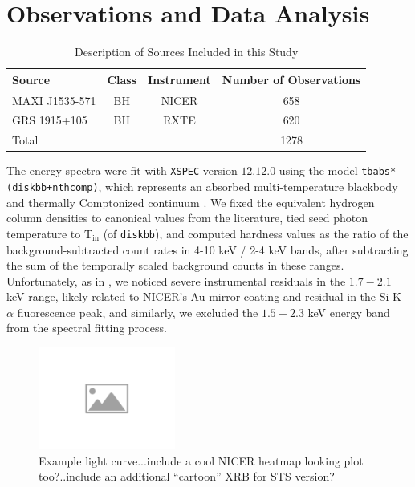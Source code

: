 \documentclass[fleqn,usenatbib]{mnras}
\begin{document}
\section{Observations and Data Analysis}\label{sec:obs}

\begin{table}
    \centering\label{tab:sources}
    \caption{Description of Sources Included in this Study}
    \begin{tabular}{l c c c}
    \hline 
    \hline
    Source & Class & Instrument & Number of Observations  \\
    \hline
    MAXI J1535-571 & BH & NICER & 658 \\
    GRS 1915+105 & BH & RXTE & 620 \\
    \hline
    Total & & & 1278 \\
    \hline 
    \end{tabular}
    
\end{table}

The energy spectra were fit with \texttt{XSPEC} version $12.12.0$ using the model \texttt{tbabs*(diskbb+nthcomp)}, which represents an absorbed multi-temperature blackbody and thermally Comptonized continuum \citep{cuneo2020,Mitsuda1984,Kubota1998,Zdziarski1996,Zycki1999}. We fixed the equivalent hydrogen column densities to canonical values from the literature, tied seed photon temperature to $\mathrm{T}_{\mathrm{in}}$ (of \texttt{diskbb}), and computed hardness values as the ratio of the background-subtracted count rates in 4-10 keV / 2-4 keV bands, after subtracting the sum of the temporally scaled background counts in these ranges. Unfortunately, as in \cite{miller2018}, we noticed severe instrumental residuals in the $1.7-2.1$ keV range, likely related to NICER's Au mirror coating and residual in the Si K $\alpha$ fluorescence peak, and similarly, we excluded the $1.5-2.3$ keV energy band from the spectral fitting process.

\begin{figure}
    \centering
    \includegraphics[width=0.4\textwidth]{figures/placeholder-image.png}
    \caption{Example light curve...include a cool NICER heatmap looking plot too?..include an additional ``cartoon'' XRB for STS version?}
    \label{fig:lightcurve}
\end{figure}
\end{document}
